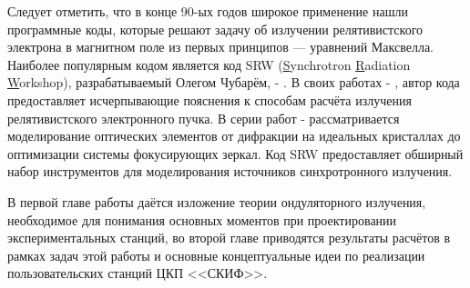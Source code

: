 Следует отметить, что в конце 90-ых годов широкое применение нашли программные коды, которые решают задачу об излучении релятивистского электрона в магнитном поле из первых принципов --- уравнений Максвелла. Наиболее популярным кодом является код SRW (\underline{S}ynchrotron \underline{R}adiation \underline{W}orkshop), разрабатываемый Олегом Чубарём, \cite{SRW} - \cite{chubar1998proceedings}. В своих работах \cite{chubar1998accurate} - \cite{chubar2002physical}, автор кода предоставляет исчерпывающие пояснения к способам расчёта излучения релятивистского электронного пучка. В серии работ \cite{chubar2001wavefront} -%
\cite{idir2017alignment} рассматривается моделирование оптических элементов от дифракции на идеальных кристаллах до оптимизации системы фокусирующих зеркал. Код SRW предоставляет обширный набор инструментов для моделирования источников синхротронного излучения. 

В первой главе работы даётся изложение теории ондуляторного излучения, необходимое для понимания основных моментов при проектировании экспериментальных станций, во второй главе приводятся результаты расчётов в рамках задач этой работы и основные концептуальные идеи по реализации пользовательских станций ЦКП <<СКИФ>>.


